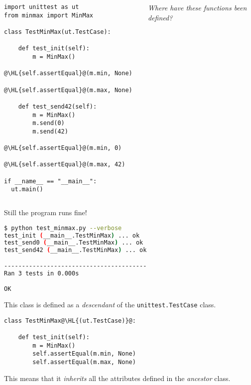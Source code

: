 \documentclass[english,serif,mathserif,xcolor=pdftex,dvipsnames,table]{beamer}
\begin{document}
\begin{frame}[fragile]
  \begin{columns}[t]
    \begin{column}{0.5\textwidth}
\begin{lstlisting}
import unittest as ut
from minmax import MinMax

class TestMinMax(ut.TestCase):

    def test_init(self):
        m = MinMax()
        @\HL{self.assertEqual}@(m.min, None)
        @\HL{self.assertEqual}@(m.max, None)

    def test_send42(self):
        m = MinMax()
        m.send(0)
        m.send(42)
        @\HL{self.assertEqual}@(m.min, 0)
        @\HL{self.assertEqual}@(m.max, 42)

if __name__ == "__main__":
  ut.main()
\end{lstlisting}
    \end{column}
    \begin{column}{0.5\textwidth}
      \raggedleft
      \emph{Where have these functions been defined?}
    \end{column}
  \end{columns}
\end{frame}


\begin{frame}[fragile]
  Still the program runs fine!

  \+
\begin{lstlisting}[language=sh]
$ python test_minmax.py --verbose
test_init (__main__.TestMinMax) ... ok
test_send0 (__main__.TestMinMax) ... ok
test_send42 (__main__.TestMinMax) ... ok

----------------------------------------
Ran 3 tests in 0.000s

OK
\end{lstlisting}
\end{frame}

\begin{frame}[fragile]
  This class is defined as a \emph{descendant} of
  the \texttt{unittest.TestCase} class.

  \+
\begin{lstlisting}
class TestMinMax@\HL{(ut.TestCase)}@:

    def test_init(self):
        m = MinMax()
        self.assertEqual(m.min, None)
        self.assertEqual(m.max, None)
\end{lstlisting}

  \+
  This means that it \emph{inherits} all the attributes defined
  in the \emph{ancestor} class.
\end{frame}
\end{document}
